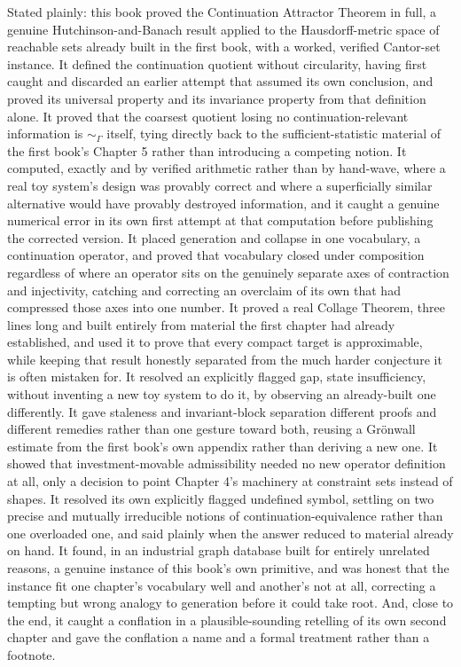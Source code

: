 \documentclass[11pt]{report}
\begin{document}
Stated plainly: this book proved the Continuation Attractor Theorem
in full, a genuine Hutchinson-and-Banach result applied to the
Hausdorff-metric space of reachable sets already built in the first
book, with a worked, verified Cantor-set instance. It defined the
continuation quotient without circularity, having first caught and
discarded an earlier attempt that assumed its own conclusion, and
proved its universal property and its invariance property from that
definition alone. It proved that the coarsest quotient losing no
continuation-relevant information is $\sim_\Gamma$ itself, tying
directly back to the sufficient-statistic material of the first
book's Chapter 5 rather than introducing a competing notion. It
computed, exactly and by verified arithmetic rather than by hand-wave,
where a real toy system's design was provably correct and where a
superficially similar alternative would have provably destroyed
information, and it caught a genuine numerical error in its own first
attempt at that computation before publishing the corrected version.
It placed generation and collapse in one vocabulary,
a continuation operator, and proved that vocabulary closed under
composition regardless of where an operator sits on the genuinely
separate axes of contraction and injectivity, catching and correcting
an overclaim of its own that had compressed those axes into one
number. It proved a real Collage Theorem, three lines
long and built entirely from material the first chapter had already
established, and used it to prove that every compact target is
approximable, while keeping that result honestly separated from the
much harder conjecture it is often mistaken for. It resolved an
explicitly flagged gap, state insufficiency, without inventing a new
toy system to do it, by observing an already-built one differently.
It gave staleness and invariant-block separation different proofs and
different remedies rather than one gesture toward both, reusing a
Gr\"onwall estimate from the first book's own appendix rather than
deriving a new one. It showed that investment-movable admissibility
needed no new operator definition at all, only a decision to point
Chapter 4's machinery at constraint sets instead of shapes. It
resolved its own explicitly flagged undefined symbol, settling on two
precise and mutually irreducible notions of continuation-equivalence
rather than one overloaded one, and said plainly when the answer
reduced to material already on hand. It found, in an industrial graph
database built for entirely unrelated reasons, a genuine instance of
this book's own primitive, and was honest that the instance fit one
chapter's vocabulary well and another's not at all, correcting a
tempting but wrong analogy to generation before it could take root.
And, close to the end, it caught
a conflation in a plausible-sounding retelling of its own second
chapter and gave the conflation a name and a formal treatment rather
than a footnote.
\end{document}
